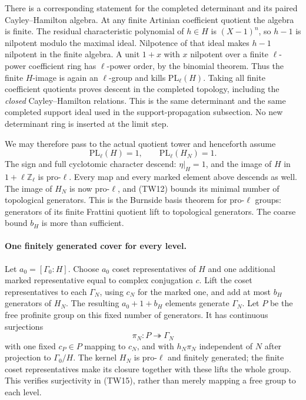 There is a corresponding statement for the completed determinant
and its paired Cayley--Hamilton algebra.
At any finite Artinian coefficient quotient the algebra is finite.
The residual characteristic polynomial of \(h\in H\) is
\((X-1)^n\), so \(h-1\) is nilpotent modulo the maximal ideal.
Nilpotence of that ideal makes \(h-1\) nilpotent in the finite
algebra.  A unit \(1+x\) with \(x\) nilpotent over a finite
\(\ell\)-power coefficient ring has \(\ell\)-power order,
by the binomial theorem.
Thus the finite \(H\)-image is again an \(\ell\)-group and
kills \(\mathrm{PL}_\ell(H)\).
Taking all finite coefficient quotients proves descent in the
completed topology, including the \emph{closed}
Cayley--Hamilton relations.
This is the same determinant and the same completed support
ideal used in the support-propagation subsection.
No new determinant ring is inserted at the limit step.

We may therefore pass to the actual quotient tower and henceforth
assume
\[
             \mathrm{PL}_\ell(H)=1,\qquad
             \mathrm{PL}_\ell(H_N)=1 .
 \tag{TW14}
\]
The sign and full cyclotomic character descend:
\(\eta|_H=1\), and the image of \(H\) in
\(1+\ell\mathbb Z_\ell\) is pro-\(\ell\).
Every map and every marked element above descends as well.
The image of \(H_N\) is now pro-\(\ell\), and (TW12) bounds its
minimal number of topological generators.
This is the Burnside basis theorem for pro-\(\ell\) groups:
generators of its finite Frattini quotient lift to topological
generators.  The coarse bound \(b_H\) is more than sufficient.

\paragraph{One finitely generated cover for every level.}
Let \(a_0=[\Gamma_0:H]\).
Choose \(a_0\) coset representatives of \(H\) and one additional
marked representative equal to complex conjugation \(c\).
Lift the coset representatives to each \(\Gamma_N\), using
\(c_N\) for the marked one, and add at most \(b_H\) generators
of \(H_N\).
The resulting \(a_0+1+b_H\) elements generate \(\Gamma_N\).
Let \(P\) be the free profinite group on this fixed number of
generators.
It has continuous surjections
\[
                       \pi_N:P\twoheadrightarrow\Gamma_N
 \tag{TW15}
\]
with one fixed \(c_P\in P\) mapping to \(c_N\), and with
\(h_N\pi_N\) independent of \(N\) after projection to
\(\Gamma_0/H\).
The kernel \(H_N\) is pro-\(\ell\) and finitely generated;
the finite coset representatives make its closure together with
these lifts the whole group.
This verifies surjectivity in (TW15), rather than merely
mapping a free group to each level.

